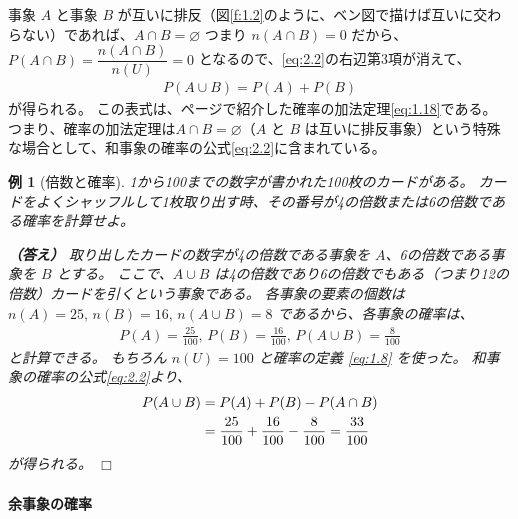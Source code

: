 \documentclass[12pt]{ltjsarticle}\usepackage{ifthen}\newcounter{enlarge}\setcounter{enlarge}{1}
\def\qed{\hfill $\Box$}
\newtheorem{eg}{例}
\begin{document}
事象 $A$ と事象 $B$ が互いに排反（図\ref{f:1.2}のように、ベン図で描けば互いに交わらない）であれば、$A \cap B = \varnothing$ つまり $ n(A \cap B) = 0$ だから、$P(A \cap B) = \dfrac{n(A \cap B)}{n(U)} = 0$ となるので、\eqref{eq:2.2}の右辺第3項が消えて、
\begin{align}
  P(A \cup B) = P(A) + P(B) \label{eq:2.3}
\end{align}
が得られる。
この表式は、\pageref{eq:1.19}ページで紹介した確率の加法定理\eqref{eq:1.18}である。
つまり、確率の加法定理は$A \cap B = \varnothing$（$A$ と $B$ は互いに排反事象）という特殊な場合として、和事象の確率の公式\eqref{eq:2.2}に含まれている。

\begin{eg}[倍数と確率]
  1から100までの数字が書かれた100枚のカードがある。
  カードをよくシャッフルして1枚取り出す時、その番号が4の倍数または6の倍数である確率を計算せよ。

  \textbf{（答え）}
  取り出したカードの数字が4の倍数である事象を $A$、6の倍数である事象を $B$ とする。
  ここで、$A \cup B$ は4の倍数であり6の倍数でもある（つまり12の倍数）カードを引くという事象である。
  各事象の要素の個数は $n(A) = 25,\, n(B) = 16,\, n(A \cup B) = 8$ であるから、各事象の確率は、
  \begin{align}
    P(A) = \frac{25}{100},\, P(B) = \frac{16}{100},\, P(A \cup B) = \frac{8}{100} \label{eq:2.3.1}
  \end{align}
  と計算できる。
  もちろん $n(U) = 100$ と確率の定義 \eqref{eq:1.8} を使った。
  和事象の確率の公式\eqref{eq:2.2}より、
  \begin{align}
    P(A \cup B) &= P(A) + P(B) - P(A \cap B) \notag \\
                &= \frac{25}{100} + \frac{16}{100} - \frac{8}{100} = \frac{33}{100} \label{eq:2.3.2}
  \end{align}
  が得られる。
\qed\end{eg}

\paragraph{余事象の確率}
\end{document}
